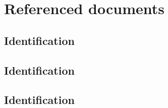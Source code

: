 

\chapter{Referenced documents}
\label{loc:Referenced documents}


\section{Identification}
\label{loc:Identification}


\section{Identification}
\label{loc:Identification}


\section{Identification}
\label{loc:Identification}



